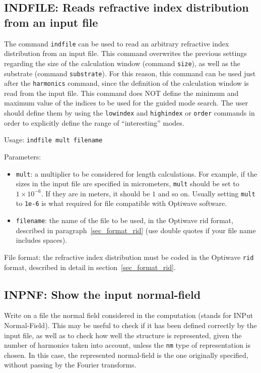 \subsection{INDFILE: Reads refractive index distribution from an input file}
\label{subsec_indfile}
    The command \lstinline!indfile! can be used to read an arbitrary refractive index 
    distribution from an input file. 
    This command overwrites the previous settings regarding the size of the 
    calculation window (command \lstinline!size!), as well as the substrate 
    (command \lstinline!substrate!). For this reason, this command can be used just after 
    the \lstinline!harmonics! command, since the definition of the calculation window is 
    read from the input file. This command does NOT define the minimum and 
    maximum value of the indices to be used for the guided mode search. The user 
    should define them by using the \lstinline!lowindex! and \lstinline!highindex! or \lstinline!order! commands in order to explicitly define the range of ``interesting'' modes.

    Usage: \lstinline!indfile mult filename!
        
    Parameters:
    \begin{itemize}
    \item \lstinline!mult!: a multiplier to be considered for length 
    calculations. For example, if the sizes in the input file are specified in micrometers, \lstinline!mult! should be set to $1\times 10^{-6}$. 
    If they are in meters, it should be $1$ and so on. Usually setting \lstinline!mult! to \lstinline!1e-6! is what required for file compatible with Optiwave software.
    \item\lstinline!filename!: the name of the file to be used, in the Optiwave rid format, described in paragraph~\ref{sec_format_rid} (use double quotes if your file name includes spaces).
   \end{itemize}
    
    File format: the refractive index distribution must be coded in the Optiwave \lstinline!rid! format, described in detail in section~\ref{sec_format_rid}.

\subsection{INPNF: Show the input normal-field}
\label{subsec_inpnf}
Write on a file the normal field considered in the computation (stands for INPut Normal-Field). This may be useful to check if it has been 
defined correctly by the input file, as well as to check how well the structure
is represented, given the number of harmonics taken into account, unless the \lstinline!nm! type of representation is chosen. In this case, the represented normal-field is the one originally specified, without passing by the Fourier transforms.
    

